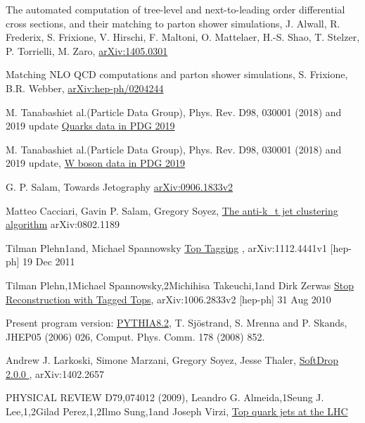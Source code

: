 \documentclass[12pt,a4paper]{article}		%
\begin{document}
\begin{thebibliography}{}
	 The automated computation of tree-level and next-to-leading order differential cross sections, and their matching to parton shower simulations, J. Alwall, R. Frederix, S. Frixione, V. Hirschi, F. Maltoni, O. Mattelaer, H.-S. Shao, T. Stelzer, P. Torrielli, M. Zaro, \href{https://arxiv.org/abs/1405.0301}{arXiv:1405.0301}
	
	Matching NLO QCD computations and parton shower simulations, S. Frixione, B.R. Webber,
	\href{https://arxiv.org/abs/hep-ph/0204244}{arXiv:hep-ph/0204244}
	
	 M. Tanabashiet al.(Particle Data Group), Phys. Rev. D98, 030001 (2018) and 2019 update \href{http://pdg.lbl.gov/2019/tables/rpp2019-sum-quarks.pdf}{Quarks data in PDG 2019}
	
	 M. Tanabashiet al.(Particle Data Group), Phys. Rev. D98, 030001 (2018) and 2019 update,  \href{http://pdg.lbl.gov/2019/listings/rpp2019-list-w-boson.pdf}{W boson data in PDG 2019}
	
	 G. P. Salam, Towards Jetography \href{https://arxiv.org/abs/0906.1833}{arXiv:0906.1833v2}
	
	 Matteo Cacciari, Gavin P. Salam, Gregory Soyez, \href{https://arxiv.org/abs/0802.1189}{The anti-k_t jet clustering algorithm}  	arXiv:0802.1189
	
	 Tilman  Plehn1and, Michael Spannowsky \href{https://arxiv.org/pdf/1112.4441.pdf}{Top Tagging} , arXiv:1112.4441v1  [hep-ph]  19 Dec 2011
	
	 Tilman Plehn,1Michael Spannowsky,2Michihisa Takeuchi,1and Dirk Zerwas \href{https://arxiv.org/pdf/1006.2833.pdf}{Stop Reconstruction with Tagged Tops}, arXiv:1006.2833v2 [hep-ph] 31 Aug 2010
	
	 Present program version: \href{http://home.thep.lu.se/~torbjorn/Pythia.html}{PYTHIA8.2}, T. Sjöstrand, S. Mrenna and P. Skands, JHEP05 (2006) 026, Comput. Phys. Comm. 178 (2008) 852. 
	
	 Andrew J. Larkoski, Simone Marzani, Gregory Soyez, Jesse Thaler,  \href{https://phab.hepforge.org/source/fastjetsvn/browse/contrib/contribs/RecursiveTools/tags/2.0.0-beta2/}{SoftDrop 2.0.0 },  	arXiv:1402.2657 
	
	 PHYSICAL REVIEW D79,074012 (2009), Leandro G. Almeida,1Seung J. Lee,1,2Gilad Perez,1,2Ilmo Sung,1and Joseph Virzi, \href{https://journals.aps.org/prd/pdf/10.1103/PhysRevD.79.074012}{Top quark jets at the LHC}
	

\end{thebibliography}
\end{document}
